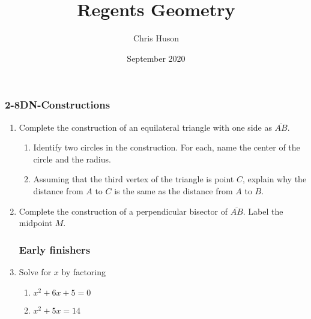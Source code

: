 \documentclass[12pt, twoside]{article}
\title{Regents Geometry}
\author{Chris Huson}
\date{September 2020}
\begin{document}
\subsubsection*{2-8DN-Constructions}
\begin{enumerate}
\item Complete the construction of an equilateral triangle with one side as $\overline{AB}$. \vspace{3cm}
  \begin{center}
  \end{center} \vspace{3cm}
  \begin{enumerate}
    \item Identify two circles in the construction. For each, name the center of the circle and the radius.  \vspace{3cm}
    \item Assuming that the third vertex of the triangle is point $C$, explain why the distance from $A$ to $C$ is the same as the distance from $A$ to $B$.
  \end{enumerate}

\newpage
\item Complete the construction of a perpendicular bisector of $\overline{AB}$. Label the midpoint $M$. \vspace{2cm}
  \begin{center}
  \end{center} \vspace{3cm}

  \subsubsection*{Early finishers}
\item Solve for $x$ by factoring
    \begin{multicols}{2}
      \begin{enumerate}
      \item $x^2+6x+5=0$
      \item $x^2+5x=14$
      \end{enumerate}
      \end{multicols}


\end{enumerate}
\end{document}
